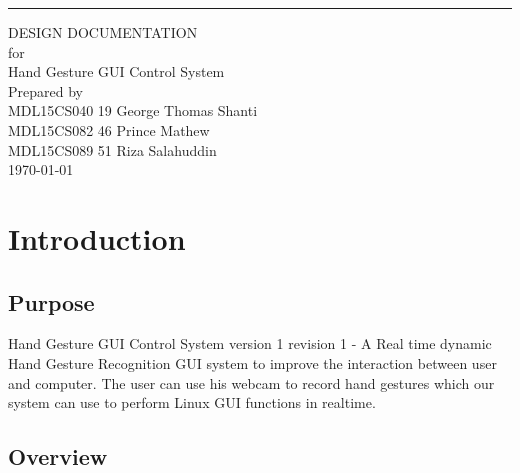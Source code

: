 \documentclass{scrreprt}
\date{}
\begin{document}
\begin{flushright}
    \rule{16cm}{5pt}\vskip1cm
    \begin{bfseries}
        \Huge{DESIGN DOCUMENTATION}\\
        \vspace{1.9cm}
        for\\
        \vspace{1.9cm}
        Hand Gesture GUI Control System\\
        \vspace{1.9cm}
        \LARGE
        Prepared by \\MDL15CS040 19 George Thomas Shanti
        \\MDL15CS082 46 Prince Mathew
        \\MDL15CS089 51 Riza Salahuddin\\
        \vspace{1.9cm}
        \today\\
    \end{bfseries}
\end{flushright}

\tableofcontents

\newpage
\chapter{Introduction}
\section{Purpose}
Hand Gesture GUI Control System version 1 revision 1 - A Real time dynamic Hand Gesture Recognition GUI system to improve the interaction between user and computer. The user can use his webcam to record hand gestures which our system can use to perform Linux GUI functions in realtime.

\section{Overview}
\end{document}
